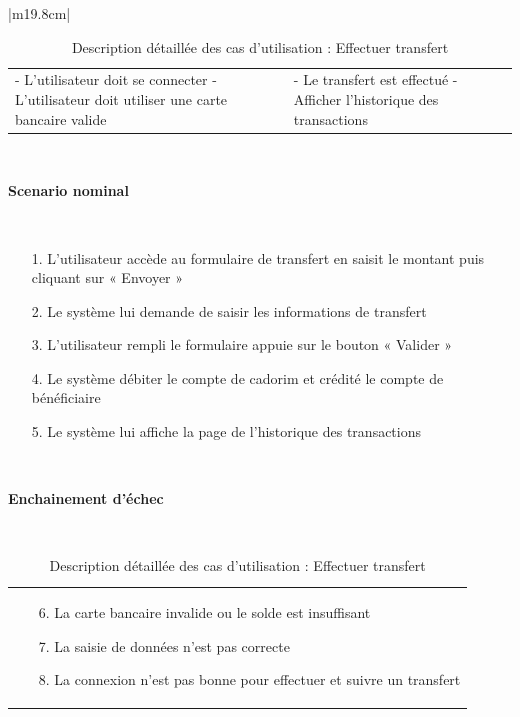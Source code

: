 \begin{table}[h]
\begin{tabular}{|m{19.8cm}|}
		\hline
		\begin{tabular}{m{9.3cm}|m{9.3cm}}
			- L’utilisateur doit se connecter \newline
			- L’utilisateur doit utiliser une carte bancaire valide & 
			- Le transfert est effectué \newline
			- Afficher  l'historique des transactions
			\\[0ex]
		\end{tabular}
		\\
		\hline
		\begin{center}
			\textbf{Scenario nominal}
		\end{center}
		\\
		[-4ex]
		\hline
		\begin{enumerate}
			\item [1.] L’utilisateur accède au formulaire de transfert en saisit le montant puis  cliquant sur « Envoyer »
			\item [2.] Le système lui demande de saisir les informations de transfert
			\item [3.] L’utilisateur rempli le formulaire appuie sur le bouton « Valider »
			\item [4.] Le système débiter le compte de cadorim et crédité le compte de bénéficiaire
			\item [5.] Le système lui affiche la page de l'historique des transactions
		\end{enumerate}
		\\
		[-4ex]
		\hline	
		\begin{center}
			\textbf{Enchainement d’échec }
		\end{center}
		\\ 
		[-4ex]
		\hline
		\begin{tabular}{m{17.5cm}}
			\begin{enumerate}
				\item [6.] La carte bancaire invalide ou le solde est insuffisant
				\item [7.] La saisie de données n’est pas correcte
				\item [8.] La connexion n’est pas bonne pour effectuer et suivre un transfert
			\end{enumerate}
			\\[-4ex]
		\end{tabular}
		\\
		\hline	
		
	\end{tabular}
	\vspace*{1.5cm}
	\centering \caption{Description détaillée des cas d'utilisation : Effectuer transfert}
	\label{4.1}
\end{table}


